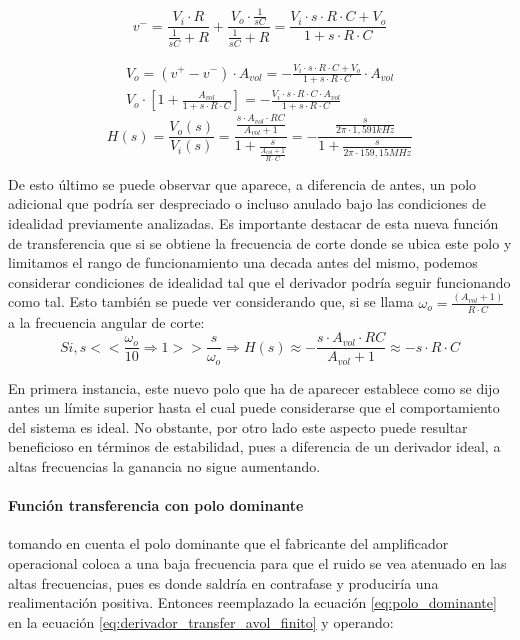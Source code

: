 \begin{equation*}
	v^{-} = \frac{V_i \cdot R}{\frac{1}{sC} + R} + \frac{V_o \cdot \frac{1}{sC}}{\frac{1}{sC} + R}
	= \frac{V_i \cdot s \cdot R \cdot C + V_o}{1 + s \cdot R \cdot C}
\end{equation*}

\begin{align*}
	V_o = (v^{+} - v^{-}) \cdot A_{vol}
	= - \frac{V_i \cdot s \cdot R \cdot C + V_o}{1 + s \cdot R \cdot C} \cdot A_{vol} \\
	V_o \cdot \left[ 1 + \frac{A_{vol}}{1 + s \cdot R \cdot C} \right]
	= - \frac{V_i \cdot s \cdot R \cdot C \cdot A_{vol}}{1 + s \cdot R \cdot C}
\end{align*}
\begin{equation}
	H(s) = \frac{V_o(s)}{V_i(s)} = \frac{\frac{s \cdot A_{vol} \cdot RC}{A_{vol} + 1}}{1 + \frac{s}{\frac{A_{vol} + 1}{R \cdot C}}}
	= - \frac{\frac{s}{2 \pi \cdot 1,591kHz}}{1 + \frac{s}{2 \pi \cdot 159,15MHz}}
	\label{eq:derivador_transfer_avol_finito}
\end{equation}

De esto \'ultimo se puede observar que aparece, a diferencia de antes, un polo adicional que podr\'ia ser despreciado o incluso anulado bajo las condiciones de idealidad previamente analizadas. Es importante destacar de esta nueva funci\'on de transferencia que si se obtiene la frecuencia de corte donde se ubica este polo y limitamos el rango de funcionamiento una decada antes del mismo, podemos considerar condiciones de idealidad tal que el derivador podr\'ia seguir funcionando como tal. Esto tambi\'en se puede ver considerando que, si se llama $\omega_o = \frac{(A_{vol} + 1)}{R \cdot C}$ a la frecuencia angular de corte:
\begin{equation*}
	Si, s << \frac{\omega_o}{10} \Rightarrow 1 >> \frac{s}{\omega_o} \Rightarrow 
	H(s) \approx - \frac{s \cdot A_{vol} \cdot RC}{A_{vol} + 1} \approx
	- s \cdot R \cdot C
\end{equation*}

En primera instancia, este nuevo polo que ha de aparecer establece como se dijo antes un l\'imite superior hasta el
cual puede considerarse que el comportamiento del sistema es ideal. No obstante, por otro lado este aspecto puede resultar beneficioso
en t\'erminos de estabilidad, pues a diferencia de un derivador ideal, a altas frecuencias la ganancia no sigue aumentando.


\paragraph*{Funci\'on transferencia con polo dominante} tomando en cuenta el polo dominante 
que el fabricante del amplificador operacional coloca a una baja frecuencia para 
que el ruido se vea atenuado en las altas frecuencias, pues es donde saldr\'ia en contrafase
y producir\'ia una realimentaci\'on positiva. Entonces reemplazado la ecuaci\'on \ref{eq:polo_dominante} 
en la ecuaci\'on \ref{eq:derivador_transfer_avol_finito} y operando:

